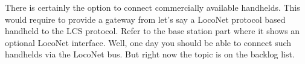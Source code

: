 There is certainly the option to connect commercially available handhelds. This would require to provide a gateway from let's say a LocoNet protocol based handheld to the LCS protocol. Refer to the base station part where it shows an optional LocoNet interface. Well, one day you should be able to connect such handhelds via the LocoNet bus. But right now the topic is on the backlog list.
